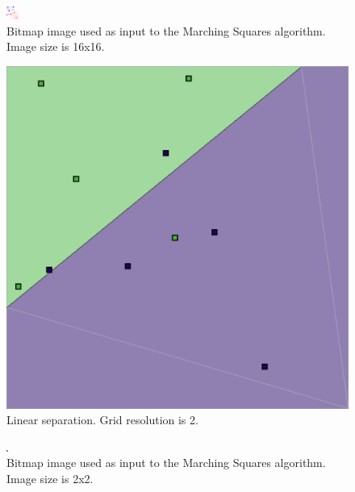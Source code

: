 \documentclass[12pt]{article}
\begin{document}
\begin{figure} 
\centering
  \includegraphics[width = 3 in]{16_res_image.png}
  \caption{Bitmap image used as input to the Marching Squares algorithm.
Image size is 16x16.
}
\end{figure}


\begin{figure} 
\centering
  \includegraphics[width = 3 in]{2_res.png}
  \caption{Linear separation. Grid resolution is 2.
}
\end{figure}

\begin{figure} 
\centering
  \includegraphics[width = 3 in]{2_res_image.png}
  \caption{Bitmap image used as input to the Marching Squares algorithm.
Image size is 2x2.
}
\end{figure}
\end{document}
